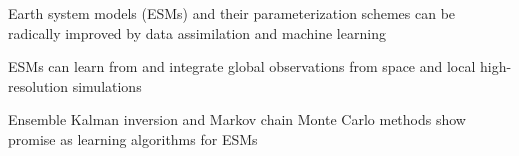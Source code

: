 \documentclass[draft]{agujournal}
\begin{document}





\begin{keypoints}
\item Earth system models (ESMs) and their parameterization schemes can be radically improved by data assimilation and machine learning
\item ESMs can learn from and integrate global observations from space and local high-resolution simulations
\item Ensemble Kalman inversion and Markov chain Monte Carlo methods show promise as learning algorithms for ESMs
\end{keypoints}

%
%

\end{document}

